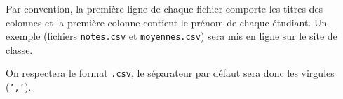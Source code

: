 
Par convention, la première ligne de chaque fichier comporte les titres des colonnes et la première colonne contient le prénom de chaque étudiant. Un exemple (fichiers \texttt{notes.csv} et \texttt{moyennes.csv}) sera mis en ligne sur le site de classe. 

On respectera le format  \texttt{.csv}, le séparateur par défaut sera donc les virgules (\texttt{','}). 